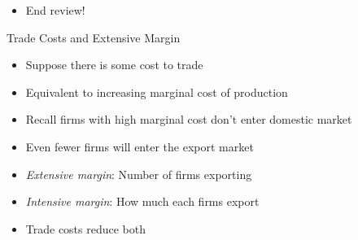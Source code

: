 \documentclass{beamer}
\begin{document}

\begin{frame}
    \begin{itemize}
        \item End review!
    \end{itemize}
\end{frame}

\begin{frame}{Trade Costs and Extensive Margin} 
    \begin{itemize}
        \item Suppose there is some cost to trade 
        \item Equivalent to increasing marginal cost of production
        \item Recall firms with high marginal cost don't enter domestic market 
        \item Even fewer firms will enter the export market
        \item \emph{Extensive margin}: Number of firms exporting
        \item \emph{Intensive margin}: How much each firms export
        \item Trade costs reduce both
    \end{itemize}
\end{frame}
\end{document}
